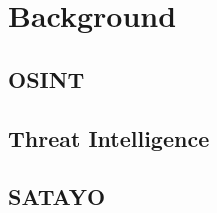 \chapter{Background}
\label{cha:background}

\section{OSINT}
\label{sec:osint}

\lipsum[1]

\section{Threat Intelligence}
\label{sec:ti}

\lipsum[1]

\section{SATAYO}
\label{sec:satayo}

\lipsum[1]